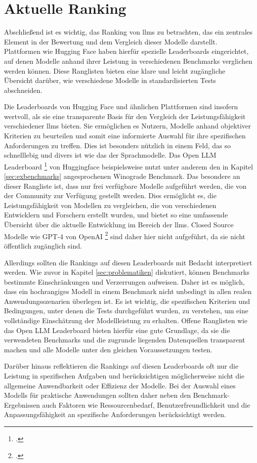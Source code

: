 \section{Aktuelle Ranking} \label{sec:aktuelle_rankings}
Abschließend ist es wichtig, das Ranking von \acp{llm} zu betrachten, das ein zentrales Element in der Bewertung und dem Vergleich dieser Modelle darstellt. Plattformen wie Hugging Face haben hierfür spezielle Leaderboards eingerichtet, auf denen Modelle anhand ihrer Leistung in verschiedenen Benchmarks verglichen werden können. Diese Ranglisten bieten eine klare und leicht zugängliche Übersicht darüber, wie verschiedene Modelle in standardisierten Tests abschneiden.

Die Leaderboards von Hugging Face und ähnlichen Plattformen sind insofern wertvoll, als sie eine transparente Basis für den Vergleich der Leistungsfähigkeit verschiedener \acp{llm} bieten. Sie ermöglichen es Nutzern, Modelle anhand objektiver Kriterien zu beurteilen und somit eine informierte Auswahl für ihre spezifischen Anforderungen zu treffen. Dies ist besonders nützlich in einem Feld, das so schnelllebig und divers ist wie das der Sprachmodelle.
Das Open LLM Leaderboard \footcite[Vgl.][]{open-llm-leaderboard} von Huggingface beispielsweise nutzt unter anderem den in Kapitel \ref{sec:exbenchmarks} angesprochenen Winograde Benchmark.
Das besondere an dieser Rangliste ist, dass nur frei verfügbare Modelle aufgeführt werden, die von der Community zur Verfügung gestellt werden. 
Dies ermöglicht es, die Leistungsfähigkeit von Modellen zu vergleichen, die von verschiedenen Entwicklern und Forschern erstellt wurden, und bietet so eine umfassende Übersicht über die aktuelle Entwicklung im Bereich der \acp{llm}.
Closed Source Modelle wie GPT-4 von OpenAI \footcite[Vgl.][S. 1]{openai2023gpt4} sind daher hier nicht aufgeführt, da sie nicht öffentlich zugänglich sind.

Allerdings sollten die Rankings auf diesen Leaderboards mit Bedacht interpretiert werden. Wie zuvor in Kapitel \ref{sec:problematiken} diskutiert, können Benchmarks bestimmte Einschränkungen und Verzerrungen aufweisen. 
Daher ist es möglich, dass ein hochrangiges Modell in einem Benchmark nicht unbedingt in allen realen Anwendungsszenarien überlegen ist. 
Es ist wichtig, die spezifischen Kriterien und Bedingungen, unter denen die Tests durchgeführt wurden, zu verstehen, um eine vollständige Einschätzung der Modellleistung zu erhalten.
Offene Ranglisten wie das Open LLM Leaderboard bieten hierfür eine gute Grundlage, da sie die verwendeten Benchmarks und die zugrunde liegenden Datenquellen transparent machen und alle Modelle unter den gleichen Voraussetzungen testen.

Darüber hinaus reflektieren die Rankings auf diesen Leaderboards oft nur die Leistung in spezifischen Aufgaben und berücksichtigen möglicherweise nicht die allgemeine Anwendbarkeit oder Effizienz der Modelle. 
Bei der Auswahl eines Modells für praktische Anwendungen sollten daher neben den Benchmark-Ergebnissen auch Faktoren wie Ressourcenbedarf, Benutzerfreundlichkeit und die Anpassungsfähigkeit an spezifische Anforderungen berücksichtigt werden.
